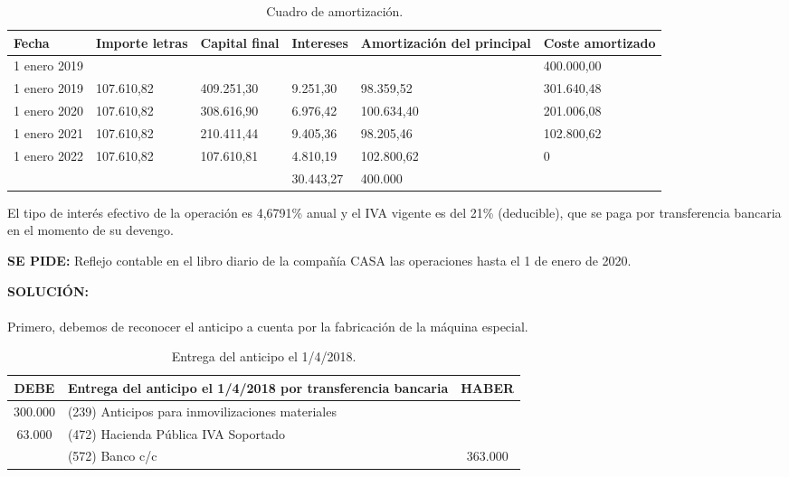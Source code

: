 \begin{table}[H]
    \centering
    \begin{tabular}{|p{3cm}|p{2cm}|p{2cm}|p{2cm}|p{2cm}|p{2cm}|}
        \hline
        \rowcolor{blue!30}
        \textbf{Fecha} & \textbf{Importe letras} & \textbf{Capital final} & \textbf{Intereses} & \textbf{Amortización del principal} & \textbf{Coste amortizado} \\
        \hline
        1 enero 2019 & & & & & 400.000,00 \\
        \hline
        1 enero 2019 & 107.610,82 & 409.251,30 & 9.251,30 & 98.359,52 & 301.640,48 \\
        \hline
        1 enero 2020 & 107.610,82 & 308.616,90 & 6.976,42 & 100.634,40 & 201.006,08 \\
        \hline
        1 enero 2021 & 107.610,82 & 210.411,44 & 9.405,36 & 98.205,46 & 102.800,62 \\
        \hline
        1 enero 2022 & 107.610,82 & 107.610,81 & 4.810,19 & 102.800,62 & 0 \\
        \hline
        &&&30.443,27&400.000&\\
        \hline
    \end{tabular}
    \caption{Cuadro de amortización.}
    \label{tabla:cuadro_amortizacion_ej4}
\end{table}

El tipo de interés efectivo de la operación es 4,6791\% anual y el IVA vigente es del 21\% (deducible), que se paga por transferencia bancaria en el momento de su devengo.

\textbf{SE PIDE:} Reflejo contable en el libro diario de la compañía CASA las operaciones hasta el 1 de enero de 2020.

\textbf{SOLUCIÓN:} \\\\

Primero, debemos de reconocer el anticipo a cuenta por la fabricación de la máquina especial.

\begin{table}[H]
    \centering
    \begin{tabular}{|c|p{8cm}|c|}
        \hline
        \rowcolor{blue!30}
        \textbf{DEBE} & \textbf{Entrega del anticipo el 1/4/2018 por transferencia bancaria} & \textbf{HABER} \\
        \hline
        300.000 & (239) Anticipos para inmovilizaciones materiales & \\
        \hline
        63.000 & (472) Hacienda Pública IVA Soportado & \\
        \hline
        & (572) Banco c/c & 363.000 \\
        \hline
    \end{tabular}
    \caption{Entrega del anticipo el 1/4/2018.}
    \label{tabla:anticipo_2018}
\end{table}

